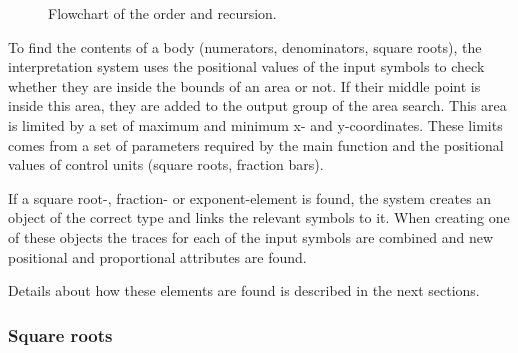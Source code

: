 \begin{figure}[H]
\centering
    \caption{Flowchart of the order and recursion.}

\label{fig:interpretation_flowchart}
\end{figure}

To find the contents of a body (numerators, denominators, square roots), the interpretation system uses the positional values of the input symbols to check whether they are inside the bounds of an area or not. If their middle point is inside this area, they are added to the output group of the area search. This area is limited by a set of maximum and minimum x- and y-coordinates. These limits comes from a set of parameters required by the main function and the positional values of control units (square roots, fraction bars).

If a square root-, fraction- or exponent-element is found, the system creates an object of the correct type and links the relevant symbols to it. When creating one of these objects the traces for each of the input symbols are combined and new positional and proportional attributes are found.

Details about how these elements are found is described in the next sections.

\subsubsection{Square roots}
\label{interpretation-square-roots}

